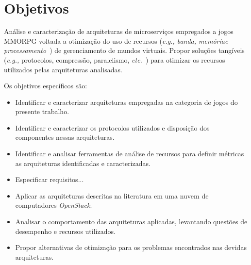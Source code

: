 \section{Objetivos}
\label{obj}

Análise e caracterização de arquiteturas de microserviços empregados a jogos MMORPG voltada a otimização do uso de recursos (\textit{\textit{e.g.,} banda, memóriae processamento}~\cite{1417630}) de gerenciamento de mundos virtuais. 
%
Propor soluções tangíveis (\textit{e.g.,} protocolos, compressão, paralelismo, \textit{etc.}~\cite{1417630}) para otimizar os recursos utilizados pelas arquiteturas analisadas.

Os objetivos específicos são:
\begin{itemize}
    \item Identificar e caracterizar arquiteturas empregadas na categoria de jogos do presente trabalho.
    \item Identificar e caracterizar os protocolos utilizados e disposição dos componentes nessas arquiteturas.
    \item Identificar e analisar ferramentas de análise de recursos para definir métricas as arquiteturas identificadas e caracterizadas.
    \item Especificar requisitos... %
    \item Aplicar as arquiteturas descritas na literatura em uma nuvem de computadores \textit{OpenStack}.
    \item Analisar o comportamento das arquiteturas aplicadas, levantando questões de desempenho e recursos utilizados.
    \item Propor alternativas de otimização para os problemas encontrados nas devidas arquiteturas.
\end{itemize}
